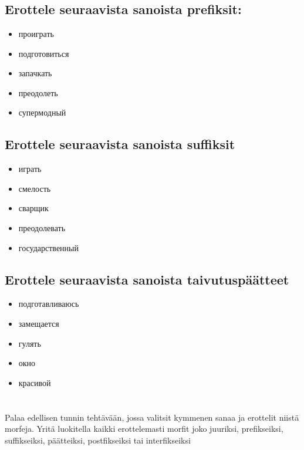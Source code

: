 \documentclass[paper=a4, fontsize=11pt]{scrartcl}
\begin{document}
\onehalfspacing

\section{}

\subsection{Erottele seuraavista sanoista prefiksit:}

\begin{itemize}
    \item проиграть
    \item подготовиться
    \item запачкать
    \item преодолеть
    \item супермодный
\end{itemize}

\subsection{Erottele seuraavista sanoista suffiksit}

\begin{itemize}
    \item играть
    \item смелость
    \item сварщик
    \item преодолевать
    \item государственный
\end{itemize}

\subsection{Erottele seuraavista sanoista taivutuspäätteet}

\begin{itemize}
    \item подготавливаюсь
    \item замещается
    \item гулять
    \item окно
    \item красивой
\end{itemize}

\section{}

Palaa edellisen tunnin tehtävään, jossa valitsit kymmenen sanaa ja erottelit
niistä morfeja. Yritä luokitella kaikki erottelemasti morfit joko juuriksi,
prefikseiksi, suffikseiksi, päätteiksi, postfikseiksi tai interfikseiksi
\end{document}
